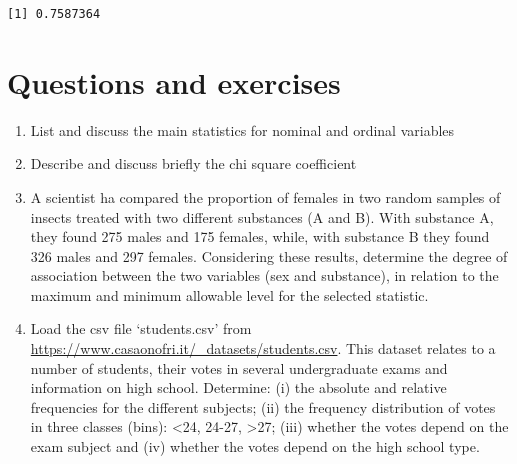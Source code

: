 \documentclass[
  letterpaper,
  DIV=11,
  numbers=noendperiod]{scrreprt}
\newenvironment{Shaded}{\begin{snugshade}}{\end{snugshade}}
\newcommand{\DecValTok}[1]{\textcolor[rgb]{0.68,0.00,0.00}{#1}}
\newcommand{\FunctionTok}[1]{\textcolor[rgb]{0.28,0.35,0.67}{#1}}
\newcommand{\NormalTok}[1]{\textcolor[rgb]{0.00,0.23,0.31}{#1}}
\newcommand{\OtherTok}[1]{\textcolor[rgb]{0.00,0.23,0.31}{#1}}
\newcommand{\SpecialCharTok}[1]{\textcolor[rgb]{0.37,0.37,0.37}{#1}}
\providecommand{\tightlist}{%
  \setlength{\itemsep}{0pt}\setlength{\parskip}{0pt}}
\begin{document}
\begin{Shaded}
\end{Shaded}

\begin{verbatim}
[1] 0.7587364
\end{verbatim}

\section{Questions and exercises}\label{questions-and-exercises}

\begin{enumerate}
\def\labelenumi{\arabic{enumi}.}
\tightlist
\item
  List and discuss the main statistics for nominal and ordinal variables
\item
  Describe and discuss briefly the chi square coefficient
\item
  A scientist ha compared the proportion of females in two random
  samples of insects treated with two different substances (A and B).
  With substance A, they found 275 males and 175 females, while, with
  substance B they found 326 males and 297 females. Considering these
  results, determine the degree of association between the two variables
  (sex and substance), in relation to the maximum and minimum allowable
  level for the selected statistic.
\item
  Load the csv file `students.csv' from
  \url{https://www.casaonofri.it/_datasets/students.csv}. This dataset
  relates to a number of students, their votes in several undergraduate
  exams and information on high school. Determine: (i) the absolute and
  relative frequencies for the different subjects; (ii) the frequency
  distribution of votes in three classes (bins): \textless24, 24-27,
  \textgreater27; (iii) whether the votes depend on the exam subject and
  (iv) whether the votes depend on the high school type.
\end{enumerate}
\end{document}
